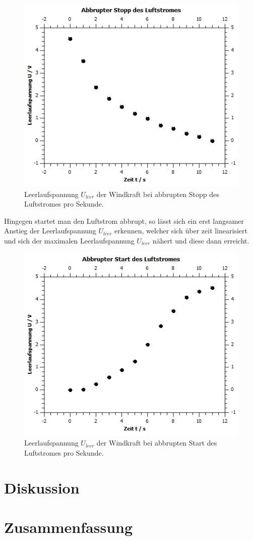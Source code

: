 \documentclass[12pt,a4paper,twoside]{article}
\begin{document}
\begin{figure}[H]
    \centering
    \includegraphics[width=0.6\linewidth]{nudes/wind stopp.jpg}
    \caption{Leerlaufspannung $U_{leer}$ der Windkraft bei abbrupten Stopp des Luftstromes pro Sekunde.}
    \label{fig:windkraft stopp diagramm}
\end{figure}

\noindent
Hingegen startet man den Luftstrom abbrupt, so lässt sich ein erst langsamer Anstieg der Leerlaufspannung $U_{leer}$ erkennen, welcher sich über zeit linearisiert und sich der maximalen Leerlaufspannung $U_{leer}$ nähert und diese dann erreicht. 

\begin{figure}[H]
    \centering
    \includegraphics[width=0.6\linewidth]{nudes/wind start.jpg}
    \caption{Leerlaufspannung $U_{leer}$ der Windkraft bei abbrupten Start des Luftstromes pro Sekunde.}
    \label{fig:windkraft start diagramm}
\end{figure}

\section{Diskussion} %


\section{Zusammenfassung} %


\printbibliography[heading=bibintoc]
\end{document}
